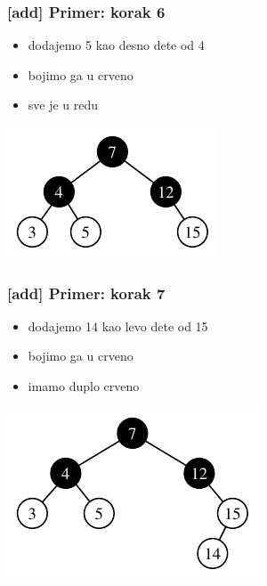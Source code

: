 \documentclass[compress]{beamer}
\begin{document}
\begin{frame}[fragile]
  \frametitle{[add] Primer: korak 6}
  \begin{itemize}
    \item dodajemo 5 kao desno dete od 4
    \item bojimo ga u crveno
    \item sve je u redu
  \end{itemize}
  \begin{center}
    \includegraphics[scale=1.0]{asp-11-add-08.pdf}
  \end{center}
\end{frame}

\begin{frame}[fragile]
  \frametitle{[add] Primer: korak 7}
  \begin{itemize}
    \item dodajemo 14 kao levo dete od 15
    \item bojimo ga u crveno
    \item imamo duplo crveno
  \end{itemize}
  \begin{center}
    \includegraphics[scale=1.0]{asp-11-add-09.pdf}
  \end{center}
\end{frame}
\end{document}
